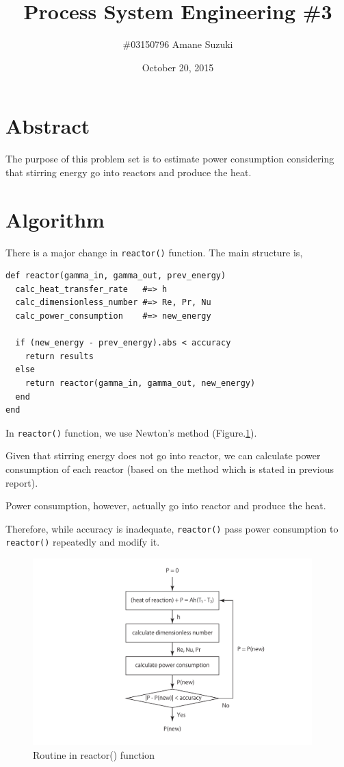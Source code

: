 \documentclass[a4paper,titlepage]{article}
\begin{document}
  \title{Process System Engineering \#3}
  \author{\#03150796 Amane Suzuki}
  \date{October 20, 2015}
  \maketitle

  \section{Abstract}
  The purpose of this problem set is to estimate power consumption considering
  that stirring energy go into reactors and produce the heat.

  \section{Algorithm}
  There is a major change in \verb/reactor()/ function. The main structure is,
  \begin{screen}
    \begin{verbatim}
def reactor(gamma_in, gamma_out, prev_energy)
  calc_heat_transfer_rate   #=> h
  calc_dimensionless_number #=> Re, Pr, Nu
  calc_power_consumption    #=> new_energy

  if (new_energy - prev_energy).abs < accuracy
    return results
  else
    return reactor(gamma_in, gamma_out, new_energy)
  end
end\end{verbatim}
  \end{screen}

  In \verb/reactor()/ function, we use Newton's method (Figure.\ref{fig:newton}).

  Given that stirring energy does not go into reactor, we can calculate
  power consumption of each reactor (based on the method which is stated in previous report).

  Power consumption, however, actually go into reactor and produce the heat.

  Therefore, while accuracy is inadequate, \verb/reactor()/ pass power consumption to \verb/reactor()/ repeatedly and modify it.

  \begin{figure}[htbp]
    \centering
    \includegraphics[height=7.2cm]{images/newton.pdf}
    \caption{Routine in reactor() function}
    \label{fig:newton}
  \end{figure}
\end{document}
